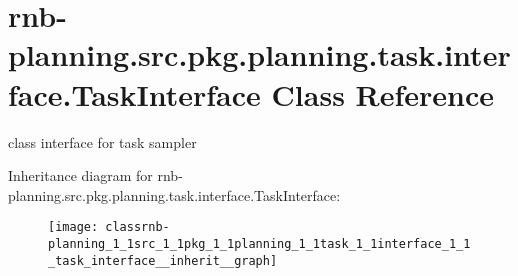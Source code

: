 \hypertarget{classrnb-planning_1_1src_1_1pkg_1_1planning_1_1task_1_1interface_1_1_task_interface}{}\section{rnb-\/planning.src.\+pkg.\+planning.\+task.\+interface.\+Task\+Interface Class Reference}
\label{classrnb-planning_1_1src_1_1pkg_1_1planning_1_1task_1_1interface_1_1_task_interface}


class interface for task sampler  




Inheritance diagram for rnb-\/planning.src.\+pkg.\+planning.\+task.\+interface.\+Task\+Interface\+:
\nopagebreak
\begin{figure}[H]
\begin{center}
\leavevmode
\texttt{[image: classrnb-planning\_1\_1src\_1\_1pkg\_1\_1planning\_1\_1task\_1\_1interface\_1\_1\_task\_interface\_\_inherit\_\_graph]}
\end{center}
\end{figure}
